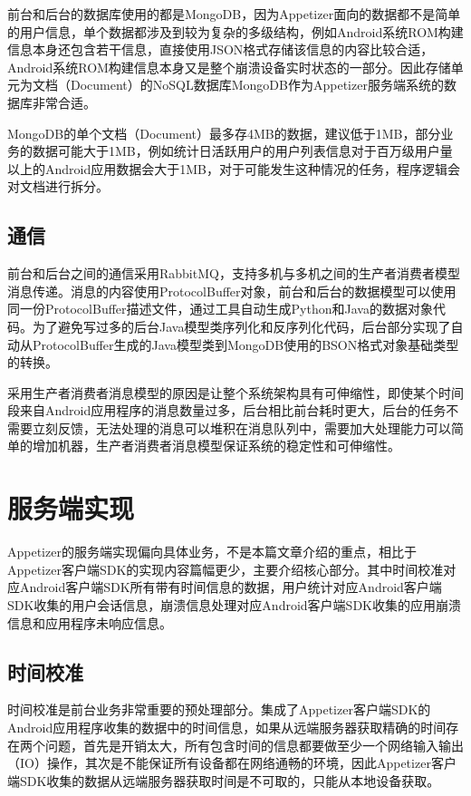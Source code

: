 前台和后台的数据库使用的都是MongoDB，因为Appetizer面向的数据都不是简单的用户信息，单个数据都涉及到较为复杂的多级结构，例如Android系统ROM构建信息本身还包含若干信息，直接使用JSON格式存储该信息的内容比较合适，Android系统ROM构建信息本身又是整个崩溃设备实时状态的一部分。因此存储单元为文档（Document）的NoSQL数据库MongoDB作为Appetizer服务端系统的数据库非常合适。

MongoDB的单个文档（Document）最多存4MB的数据，建议低于1MB，部分业务的数据可能大于1MB，例如统计日活跃用户的用户列表信息对于百万级用户量以上的Android应用数据会大于1MB，对于可能发生这种情况的任务，程序逻辑会对文档进行拆分。

\subsection{通信}
\label{subsec:rabbitmq}

前台和后台之间的通信采用RabbitMQ，支持多机与多机之间的生产者消费者模型消息传递。消息的内容使用ProtocolBuffer对象，前台和后台的数据模型可以使用同一份ProtocolBuffer描述文件，通过工具自动生成Python和Java的数据对象代码。为了避免写过多的后台Java模型类序列化和反序列化代码，后台部分实现了自动从ProtocolBuffer生成的Java模型类到MongoDB使用的BSON格式对象基础类型的转换。

采用生产者消费者消息模型的原因是让整个系统架构具有可伸缩性，即使某个时间段来自Android应用程序的消息数量过多，后台相比前台耗时更大，后台的任务不需要立刻反馈，无法处理的消息可以堆积在消息队列中，需要加大处理能力可以简单的增加机器，生产者消费者消息模型保证系统的稳定性和可伸缩性。

\section{服务端实现}
\label{sec:serverImplementation}

Appetizer的服务端实现偏向具体业务，不是本篇文章介绍的重点，相比于Appetizer客户端SDK的实现内容篇幅更少，主要介绍核心部分。其中时间校准对应Android客户端SDK所有带有时间信息的数据，用户统计对应Android客户端SDK收集的用户会话信息，崩溃信息处理对应Android客户端SDK收集的应用崩溃信息和应用程序未响应信息。

\subsection{时间校准}
\label{subsec:timecorrect}

时间校准是前台业务非常重要的预处理部分。集成了Appetizer客户端SDK的Android应用程序收集的数据中的时间信息，如果从远端服务器获取精确的时间存在两个问题，首先是开销太大，所有包含时间的信息都要做至少一个网络输入输出（IO）操作，其次是不能保证所有设备都在网络通畅的环境，因此Appetizer客户端SDK收集的数据从远端服务器获取时间是不可取的，只能从本地设备获取。

